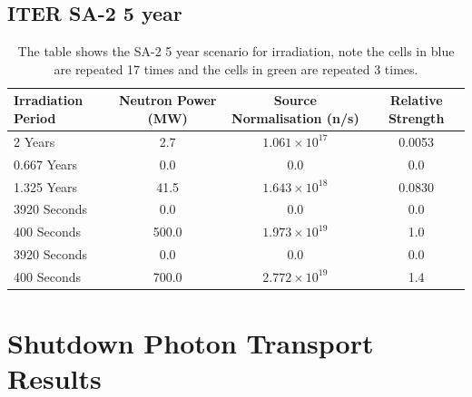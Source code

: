 \documentclass[12pt]{article}
\begin{document}
\subsection{ITER SA-2 5 year}
\begin{table}[ht!]
   \begin{tabular}{| l | c | c | c |}
      \hline 
      Irradiation Period & Neutron Power (MW) & Source Normalisation (n/s) &  Relative Strength \\
      \hline
      2 Years & 2.7 & $1.061\times10^{17}$ & 0.0053 \\
      0.667 Years & 0.0 & 0.0 & 0.0 \\
      1.325 Years & 41.5 & $1.643\times10^{18}$ & 0.0830 \\
      \cellcolor{blue!25} 3920 Seconds & \cellcolor{blue!25} 0.0 & \cellcolor{blue!25} 0.0 & \cellcolor{blue!25} 0.0 \\
      \cellcolor{blue!25} \cellcolor{blue!25} 400 Seconds & \cellcolor{blue!25} 500.0 & \cellcolor{blue!25} $1.973\times10^{19}$ & \cellcolor{blue!25} 1.0  \\
      \cellcolor{green!25} 3920 Seconds & \cellcolor{green!25} 0.0 & \cellcolor{green!25} 0.0 &\cellcolor{green!25} 0.0 \\
      \cellcolor{green!25} 400 Seconds & \cellcolor{green!25} 700.0 & \cellcolor{green!25} $2.772\times10^{19}$ &\cellcolor{green!25} 1.4 \\
      \hline
\end{tabular}
\caption{The table shows the SA-2 5 year scenario for irradiation, note the
         cells in \textcolor{blue!25}{blue} are repeated 17 times
         and the cells in \textcolor{green!25}{green} are repeated 3
         times.}
\end{table}

\newpage
\section{Shutdown Photon Transport Results}
\label{sec:sdr_results}
\end{document}
